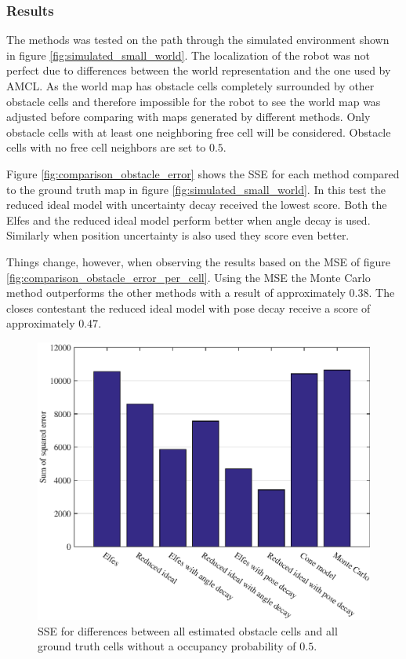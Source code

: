 \subsubsection{Results}
The methods was tested on the path through the simulated environment shown in figure \vref{fig:simulated_small_world}. 
The localization of the robot was not perfect due to differences between the world representation and the one used by AMCL.
As the world map has obstacle cells completely surrounded by other obstacle cells and therefore impossible for the robot to see the world map was adjusted before comparing with maps generated by different methods. Only obstacle cells with at least one neighboring free cell will be considered. Obstacle cells with no free cell neighbors are set to $0.5$. 

Figure \vref{fig:comparison_obstacle_error} shows the SSE for each method compared to the ground truth map in figure \vref{fig:simulated_small_world}. 
In this test the reduced ideal model with uncertainty decay received the lowest score. Both the Elfes and the reduced ideal model perform better when angle decay is used.
Similarly when position uncertainty is also used they score even better. 
 
Things change, however, when observing the results based on the MSE of figure \vref{fig:comparison_obstacle_error_per_cell}. 
Using the MSE the Monte Carlo method outperforms the other methods with a result of approximately \( 0.38\). The closes contestant the reduced ideal model with pose decay receive a score of approximately \(0.47\).

\begin{figure}[htbp]
	\centering
	\includegraphics[scale=1]{figures/static_mapping/static_mapping_sse}
	\caption{SSE for differences between all estimated obstacle cells and all ground truth cells without a occupancy probability of $0.5$.}
	\label{fig:comparison_obstacle_error}
\end{figure}

